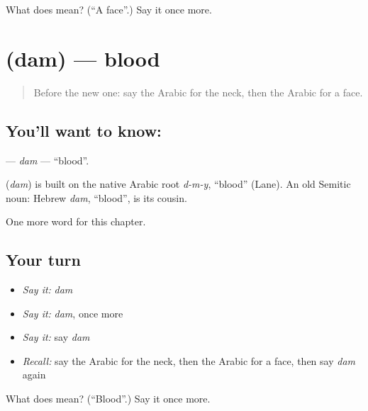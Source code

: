 \begin{tcolorbox}[breakable,colback=teal!4,colframe=teal!35!black,title={Before you move on}]
What does  mean? (\textquotedblleft{}A face\textquotedblright{}.) Say it once more.
\end{tcolorbox}
\section[\texorpdfstring{\ar{دم} (dam)}{دم (dam)}]{ (dam) — blood}

\label{lesson:AR-C52-dam}



\begin{quote}
Before the new one: say the Arabic for the neck, then the Arabic for a face.
\end{quote}

\subsection*{You'll want to know: }
\textbf{} — \emph{dam} — \textquotedblleft{}blood\textquotedblright{}.

\begin{cousinweb}
\textbf{} (\emph{dam}) is built on the native Arabic root \emph{d-m-y}, \textquotedblleft{}blood\textquotedblright{} (Lane). An old Semitic noun: Hebrew \emph{dam}, \textquotedblleft{}blood\textquotedblright{}, is its cousin.
\end{cousinweb}

\begin{grammarlens}[title={What you've built}]
One more word for this chapter.
\end{grammarlens}

\subsection*{Your turn}
\begin{itemize}
\raggedright
  \item \emph{Say it:} \emph{dam}
  \item \emph{Say it:} \emph{dam}, once more
  \item \emph{Say it:} say \emph{dam}
  \item \emph{Recall:} say the Arabic for the neck, then the Arabic for a face, then say \emph{dam} again
\end{itemize}

\begin{tcolorbox}[breakable,colback=teal!4,colframe=teal!35!black,title={Before you move on}]
What does  mean? (\textquotedblleft{}Blood\textquotedblright{}.) Say it once more.
\end{tcolorbox}
